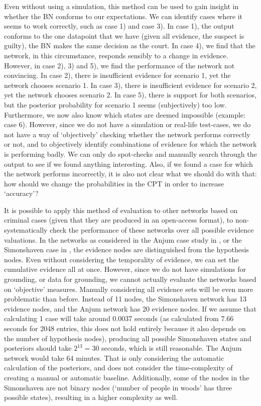 \documentclass[12pt]{article}
\begin{document}
Even without using a simulation, this method can be used to gain insight in whether the BN conforms to our expectations. We can identify cases where it seems to work correctly, such as case 1) and case 3). In case 1), the output conforms to the one datapoint that we have (given all evidence, the suspect is guilty), the BN makes the same decision as the court. In case 4), we find that the network, in this circumstance, responds sensibly to a change in evidence. However, in case 2), 3) and 5), we find the performance of the network not convincing. In case 2), there is insufficient evidence for scenario 1, yet the network chooses scenario 1. In case 3), there is insufficient evidence for scenario 2, yet the network chooses scenario 2. In case 5), there is support for both scenarios, but the posterior probability for scenario 1 seems (subjectively) too low. Furthermore, we now also know which states are deemed impossible (example: case 6). However, since we do not have a simulation or real-life test-cases, we do not have a way of `objectively' checking whether the network performs correctly or not, and to objectively identify combinations of evidence for which the network is performing badly. We can only do spot-checks and manually search through the output to see if we found anything interesting. Also, if we found a case for which the network performs incorrectly, it is also not clear what we should do with that: how should we change the probabilities in the CPT in order to increase `accuracy'?

It is possible to apply this method of evaluation to other networks based on criminal cases (given that they are produced in an open-access format), to non-systematically check the performance of these networks over all possible evidence valuations. In the networks as considered in the Anjum case study in \citet{vlek2016}, or the Simonshaven case in \citet{Fenton2019}, the evidence nodes are distinguished from the hypothesis nodes. Even without considering the temporality of evidence, we can set the cumulative evidence all at once. However, since we do not have simulations for grounding, or data for grounding, we cannot actually evaluate the networks based on `objective' measures. Manually considering all evidence sets will be even more problematic than before. Instead of 11 nodes, the Simonshaven network has 13 evidence nodes, and the Anjum network has 20 evidence nodes. If we assume that calculating 1 case will take around 0.0037 seconds (as calculated from 7.66 seconds for 2048 entries, this does not hold entirely because it also depends on the number of hypothesis nodes), producing all possible Simonshaven states and posteriors should take $2^{13} = 30$ seconds, which is still reasonable. The Anjum network would take 64 minutes. That is only considering the automatic calculation of the posteriors, and does not consider the time-complexity of creating a manual or automatic baseline. Additionally, some of the nodes in the Simonshaven are not binary nodes (`number of people in woods' has three possible states), resulting in a higher complexity as well. 
\end{document}

